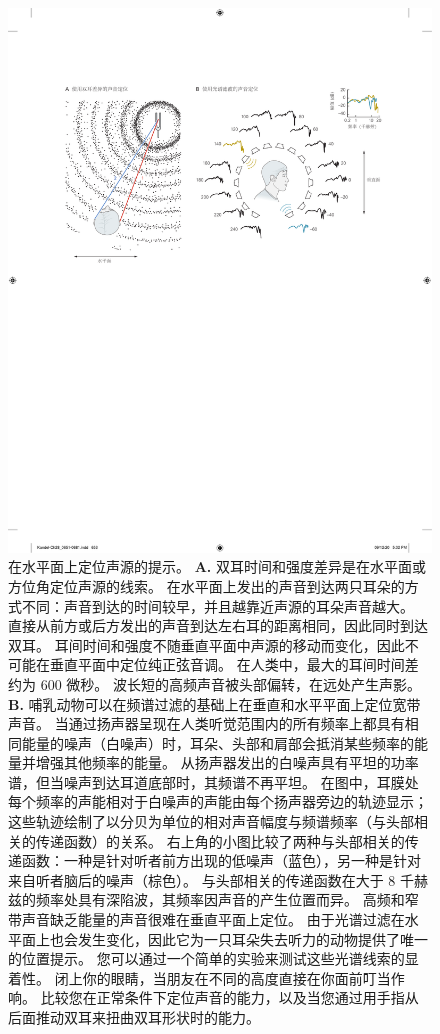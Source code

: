 \begin{figure}[htbp]
	\centering
	\includegraphics[width=1.0\linewidth]{chap28/fig_28_1}
	\caption{在水平面上定位声源的提示。
	\textbf{A.} 双耳时间和强度差异是在水平面或方位角定位声源的线索。
	在水平面上发出的声音到达两只耳朵的方式不同：声音到达的时间较早，并且越靠近声源的耳朵声音越大。
	直接从前方或后方发出的声音到达左右耳的距离相同，因此同时到达双耳。
	耳间时间和强度不随垂直平面中声源的移动而变化，因此不可能在垂直平面中定位纯正弦音调。
	在人类中，最大的耳间时间差约为 600 微秒。
	波长短的高频声音被头部偏转，在远处产生声影\cite{geisler1998sound}。
	\textbf{B.} 哺乳动物可以在频谱过滤的基础上在垂直和水平平面上定位宽带声音。
	当通过扬声器呈现在人类听觉范围内的所有频率上都具有相同能量的噪声（白噪声）时，耳朵、头部和肩部会抵消某些频率的能量并增强其他频率的能量。
	从扬声器发出的白噪声具有平坦的功率谱，但当噪声到达耳道底部时，其频谱不再平坦。
	在图中，耳膜处每个频率的声能相对于白噪声的声能由每个扬声器旁边的轨迹显示； 
	这些轨迹绘制了以分贝为单位的相对声音幅度与频谱频率（与头部相关的传递函数）的关系。
	右上角的小图比较了两种与头部相关的传递函数：一种是针对听者前方出现的低噪声（蓝色），另一种是针对来自听者脑后的噪声（棕色）。
	与头部相关的传递函数在大于 8 千赫兹的频率处具有深陷波，其频率因声音的产生位置而异。
	高频和窄带声音缺乏能量的声音很难在垂直平面上定位。
	由于光谱过滤在水平面上也会发生变化，因此它为一只耳朵失去听力的动物提供了唯一的位置提示。
	您可以通过一个简单的实验来测试这些光谱线索的显着性。
	闭上你的眼睛，当朋友在不同的高度直接在你面前叮当作响。
	比较您在正常条件下定位声音的能力，以及当您通过用手指从后面推动双耳来扭曲双耳形状时的能力。}
	\label{fig:28_1}
\end{figure}


